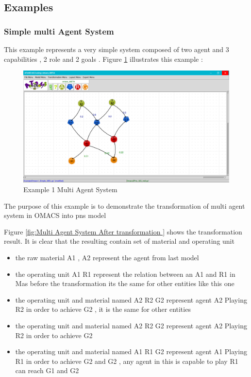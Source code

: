 \subsection{ Examples }

\subsubsection{ Simple multi Agent System }
This example represents a very simple system composed of  two agent and 3 capabilities , 2 role and 2 goals  .
 Figure \ref{fig:Example 1 Multi Agent System } illustrates this example :
\begin{figure}[th]
	\centering
 	\includegraphics[scale=0.8]{Chapiter3/img/ex1omacs}
	\caption{\label{fig:Example 1 Multi Agent System }Example 1 Multi Agent System}
\end{figure} 
 
The purpose of this example is to demonstrate the transformation of multi agent system in OMACS into pns model

Figure \ref{fig:Multi Agent System After transformation } shows the transformation result.
It is clear that the resulting contain set of material and operating unit
 
\begin{itemize}
\item the raw material A1 , A2 represent the agent from last model
\item the operating unit A1 R1 represent the relation between an A1 and R1 
in Mas before the transformation its the same for other entities like this one
\item the operating unit and material named A2 R2 G2 represent agent A2 Playing R2 in order to achieve G2 , it is the same for other entities  

\item the operating unit and material named A2 R2 G2 represent agent A2 Playing R2 in order to achieve G2 


\item the operating unit and material named A1 R1 G2 represent agent A1 Playing R1 in order to achieve G2  and G2 , any agent in this is capable to play R1 can reach G1 and G2
 

\end{itemize}
  


